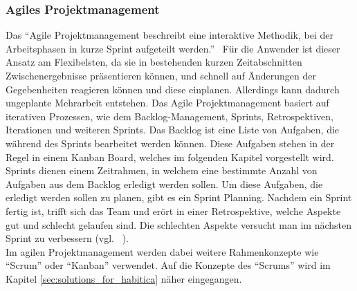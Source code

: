 \documentclass[sigconf, nonacm]{acmart}
\begin{document}
\subsubsection{Agiles Projektmanagement}
Das \enquote{Agile Projektmanagement beschreibt eine interaktive Methodik, bei der Arbeitsphasen in kurze Sprint aufgeteilt werden.}~\cite{asana_kanban_nodate} Für die Anwender ist dieser Ansatz am Flexibelsten, da sie in bestehenden kurzen Zeitabschnitten Zwischenergebnisse präsentieren können, und schnell auf Änderungen der Gegebenheiten reagieren können und diese einplanen. Allerdings kann dadurch ungeplante Mehrarbeit entstehen.
Das Agile Projektmanagement basiert auf iterativen Prozessen, wie dem Backlog-Management, Sprints, Retrospektiven, Iterationen und weiteren Sprints.
Das Backlog ist eine Liste von Aufgaben, die während des Sprints bearbeitet werden können. Diese Aufgaben stehen in der Regel in einem Kanban Board, welches im folgenden Kapitel vorgestellt wird. Sprints dienen einem Zeitrahmen, in welchem eine bestimmte Anzahl von Aufgaben aus dem Backlog erledigt werden sollen. Um diese Aufgaben, die erledigt werden sollen zu planen, gibt es ein Sprint Planning. Nachdem ein Sprint fertig ist, trifft sich das Team und erört in einer Retrospektive, welche Aspekte gut und schlecht gelaufen sind. Die schlechten Aspekte versucht man im nächsten Sprint zu verbessern (vgl. ~\cite{asana_kanban_nodate}).
\\
Im agilen Projektmanagement werden dabei weitere Rahmenkonzepte wie \enquote{Scrum} oder \enquote{Kanban} verwendet. Auf die Konzepte des \enquote{Scrums} wird im Kapitel \ref{sec:solutions_for_habitica} näher eingegangen.
\end{document}
